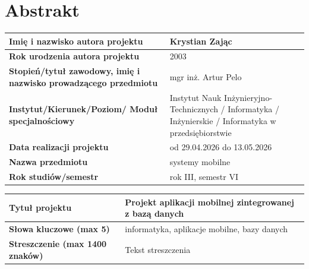 
\renewcommand{\rmdefault}{ptm} %
\renewcommand{\sfdefault}{phv} %
\chapter*{\fontsize{12}{14}\selectfont Abstrakt}

\vspace{0.5cm}
\noindent
\begin{tabular}{|p{5cm}|p{10cm}|}
\hline
\textbf{Imię i nazwisko autora projektu} & Krystian Zając\\
\hline
\textbf{Rok urodzenia autora projektu} & 2003\\
\hline
\textbf{Stopień/tytuł zawodowy, imię i nazwisko prowadzącego przedmiotu} & mgr inż. Artur Pelo\\
\hline
\textbf{Instytut/Kierunek/Poziom/ Moduł specjalnościowy} & Instytut Nauk Inżynieryjno-Technicznych / Informatyka / Inżynierskie / Informatyka w przedsiębiorstwie\\
\hline
\textbf{Data realizacji projektu} & od 29.04.2026 do 13.05.2026\\
\hline
\textbf{Nazwa przedmiotu} & systemy mobilne\\
\hline
\textbf{Rok studiów/semestr} & rok III, semestr VI\\
\hline
\end{tabular}

\vspace{1.5cm}

\noindent
\begin{tabular}{|p{5cm}|p{10cm}|}
\hline
\textbf{Tytuł projektu} & Projekt aplikacji mobilnej zintegrowanej z bazą danych\\
\hline
\textbf{Słowa kluczowe (max 5)} & informatyka, aplikacje mobilne, bazy danych\\
\hline
\textbf{Streszczenie (max 1400 znaków)} & Tekst streszczenia \\
\hline
\end{tabular}

\vspace{1.5cm}
